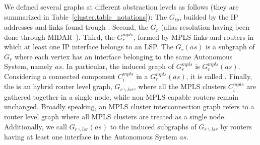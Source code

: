 We defined several graphs at different abstraction levels as follows (they are
summarized in Table~\ref{cluster.table_notations}): The  $G_{ip}$, builded
by the IP addresses and links found trough
\traceroute. Second, the  $G_{r}$ (alias resolution having been done
through MIDAR~\cite{Keys13}). Third, the  $G^{mpls}_{r}$, formed by MPLS links and routers in which at least one IP interface belongs
to an LSP.
%
%
The  $G_{r}(as)$ is a subgraph of $G_{r}$ where 
each vertex  has an interface belonging to the same Autonomous System, namely $as$. 
In particular, the induced graph of $G_r^{mpls}$ is
$G^{mpls}_{r}(as)$.  Considering a connected component $C^{mpls}_{i}$ in a $G^{mpls}_{r}(as)$, it is called  . 
%
%
%
Finally, the  is an hybrid router level
graph,  $G_{r\backslash lsr}$,
where all the MPLS clusters $C^{mpls}_{i}$ are gathered together in a single
node, while non-MPLS capable routers remain unchanged.
Broadly speaking, an MPLS cluster interconnection graph refers to a router level
graph where all MPLS clusters are treated as a single node. Additionally,
we call $G_{r\backslash lsr}(as)$ to the induced
subgraphs of $G_{r\backslash lsr}$ by routers having at least one interface in
the Autonomous System $as$.


